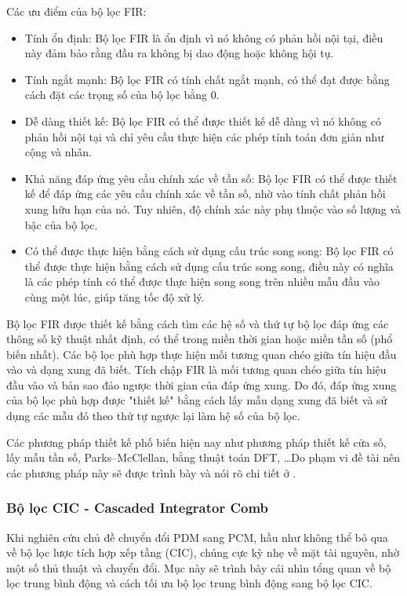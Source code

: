 Các ưu điểm của bộ lọc FIR:
\begin{itemize}
\item Tính ổn định: Bộ lọc FIR là ổn định vì nó không có phản hồi nội tại, điều này đảm bảo rằng đầu ra không bị dao động hoặc không hội tụ.
\item Tính ngắt mạnh: Bộ lọc FIR có tính chất ngắt mạnh, có thể đạt được bằng cách đặt các trọng số của bộ lọc bằng 0.
\item Dễ dàng thiết kế: Bộ lọc FIR có thể được thiết kế dễ dàng vì nó không có phản hồi nội tại và chỉ yêu cầu thực hiện các phép tính toán đơn giản như cộng và nhân.
\item Khả năng đáp ứng yêu cầu chính xác về tần số: Bộ lọc FIR có thể được thiết kế để đáp ứng các yêu cầu chính xác về tần số, nhờ vào tính chất phản hồi xung hữu hạn của nó. Tuy nhiên, độ chính xác này phụ thuộc vào số lượng và bậc của bộ lọc.
\item Có thể được thực hiện bằng cách sử dụng cấu trúc song song: Bộ lọc FIR có thể được thực hiện bằng cách sử dụng cấu trúc song song, điều này có nghĩa là các phép tính có thể được thực hiện song song trên nhiều mẫu đầu vào cùng một lúc, giúp tăng tốc độ xử lý.
\end{itemize}
Bộ lọc FIR được thiết kế bằng cách tìm các hệ số và thứ tự bộ lọc đáp ứng các thông số kỹ thuật nhất định, có thể trong miền thời gian hoặc miền tần số (phổ biến nhất). Các bộ lọc phù hợp thực hiện mối tương quan chéo giữa tín hiệu đầu vào và dạng xung đã biết. Tích chập FIR là mối tương quan chéo giữa tín hiệu đầu vào và bản sao đảo ngược thời gian của đáp ứng xung. Do đó, đáp ứng xung của bộ lọc phù hợp được "thiết kế" bằng cách lấy mẫu dạng xung đã biết và sử dụng các mẫu đó theo thứ tự ngược lại làm hệ số của bộ lọc. \cite{signalsystem}

Các phương pháp thiết kế phố biến hiện nay như phương pháp thiết kế cửa số, lấy mẫu tần số, Parks–McClellan,  bằng thuật toán DFT, 	\ldots Do phạm vi đề tài nên các phương pháp này sẽ được trình bày và nói rõ chi tiết ở \cite{TAN2014xiii}.

\subsubsection{Bộ lọc CIC -  Cascaded Integrator Comb}
Khi nghiên cứu chủ đề chuyển đổi PDM sang PCM, hầu như không thể bỏ qua về bộ lọc lược tích hợp xếp tầng (CIC), chúng cực kỳ nhẹ về mặt tài nguyên, nhờ một số thủ thuật và chuyển đổi. Mục này sẽ trình bày cái nhìn tổng quan về bộ lọc trung bình động và cách tối ưu bộ lọc trung bình động sang bộ lọc CIC.

